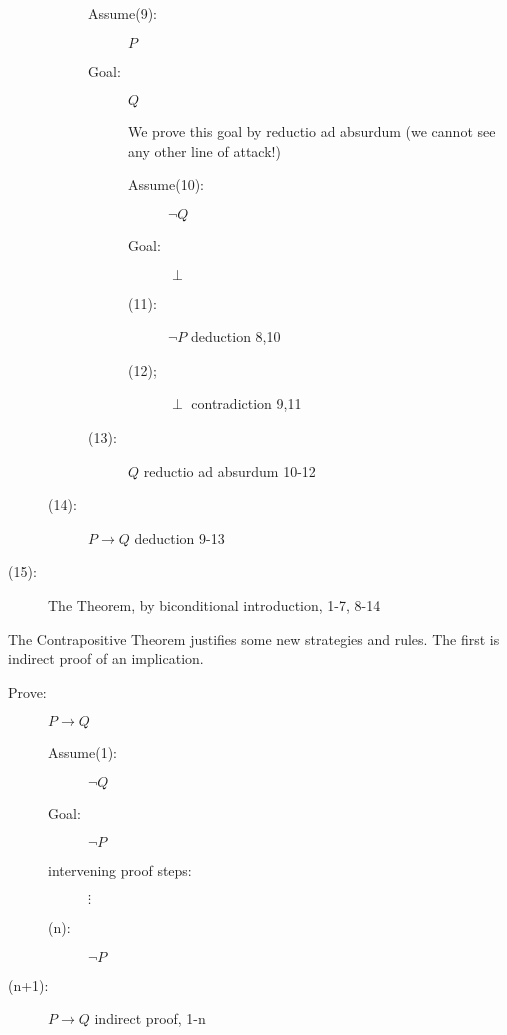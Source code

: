 \documentclass[12pt]{article}
\begin{document}
\begin{description}
\begin{description}
\begin{description}
\item[Assume(9):]  $P$

\item[Goal:]  $Q$

We prove this goal by reductio ad absurdum (we cannot see any other line of attack!)

\begin{description}

\item[Assume(10):]  $\neg Q$

\item[Goal:]  $\perp$

\item[(11):]  $\neg P$  deduction 8,10

\item[(12);]  $\perp$ contradiction 9,11

\end{description}

\item[(13):]  $Q$  reductio ad absurdum 10-12

\end{description}

\item[(14):]  $P \rightarrow Q$  deduction 9-13

\end{description}

\item[(15):]  The Theorem, by biconditional introduction, 1-7, 8-14

\end{description}

The Contrapositive Theorem justifies some new strategies and rules.  The first is indirect proof of an implication.

\begin{description}

\item[Prove:]  $P \rightarrow Q$

\begin{description}

\item[Assume(1):] $\neg Q$

\item[Goal:]  $\neg P$

\item[intervening proof steps:]  $\vdots$

\item[(n):]  $\neg P$


\end{description}

\item[(n+1):]  $P \rightarrow Q$ indirect proof, 1-n

\end{description}
\end{document}
